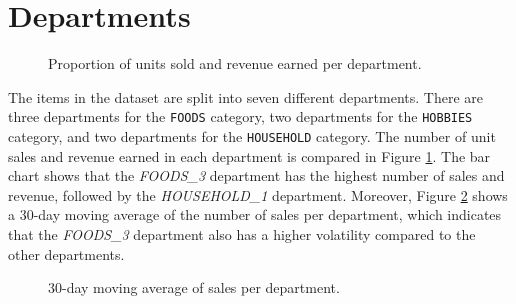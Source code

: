 \section{Departments}
\begin{figure}
    \vspace{-10pt}
    \centering
    \captionsetup{width=0.52\textwidth}
    \caption{Proportion of units sold and revenue earned per department.}
    \label{fig:sales_rev_depts}
    \vspace{-10pt}
\end{figure}
The items in the dataset are split into seven different departments.
There are three departments for the \texttt{FOODS} category, two departments for the \texttt{HOBBIES} category, and two departments for the \texttt{HOUSEHOLD} category.
The number of unit sales and revenue earned in each department is compared in Figure \ref{fig:sales_rev_depts}.
The bar chart shows that the \textit{FOODS\_3} department has the highest number of sales and revenue, followed by the \textit{HOUSEHOLD\_1} department.
Moreover, Figure \ref{fig:dept_sales} shows a 30-day moving average of the number of sales per department, which indicates that the \textit{FOODS\_3} department also has a higher volatility compared to the other departments.
\begin{figure}[H]
    \centering
    \caption{30-day moving average of sales per department.}
    \label{fig:dept_sales}
\end{figure}
